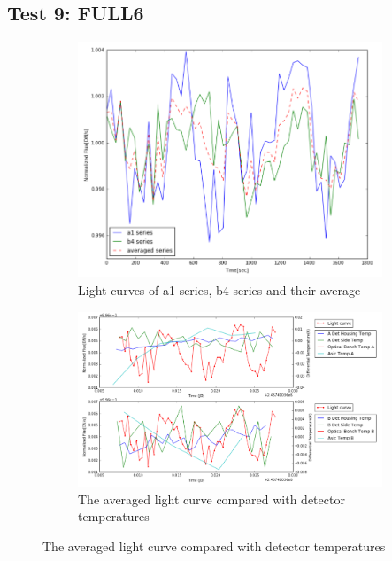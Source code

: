 \documentclass{aastex6}
\begin{document}
\subsection{Test 9: FULL6} 
\begin{figure}[H]
    \centering
    \begin{subfigure}{1}
        \includegraphics[scale=0.4]{ts_test9}
        \caption{Light curves of a1 series, b4 series and their average}
    \end{subfigure}

    \begin{subfigure}{2}
        \includegraphics[scale=0.4]{temp_test9}
        \caption{The averaged light curve compared with detector temperatures}
    \end{subfigure}
   

\end{figure}
\end{document}
